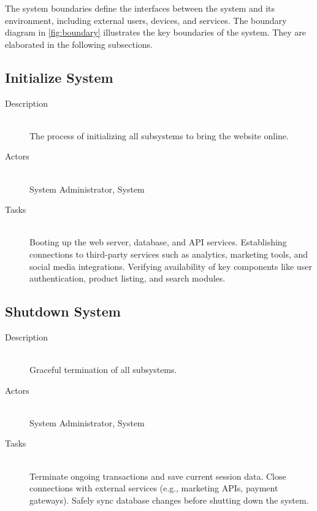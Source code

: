 \documentclass[twoside,a4paper,journal]{IEEEtran}
\begin{document}
The system boundaries define the interfaces between the system and its
environment, including external users, devices, and services.
The boundary diagram in \autoref{fig:boundary} illustrates the key boundaries
of the system.
They are elaborated in the following subsections.

\subsection{Initialize System}
\begin{description}
  \item[Description] \hfill \\
    The process of initializing all subsystems to bring the website online.
  \item[Actors] \hfill \\
    System Administrator, System
  \item[Tasks] \hfill \\
    Booting up the web server, database, and API services.
    Establishing connections to third-party services such as analytics,
    marketing tools, and social media integrations.
    Verifying availability of key components like user authentication, product
    listing, and search modules.
\end{description}

\subsection{Shutdown System}
\begin{description}
  \item[Description] \hfill \\
    Graceful termination of all subsystems.
  \item[Actors] \hfill \\
    System Administrator, System
  \item[Tasks] \hfill \\
    Terminate ongoing transactions and save current session data.
    Close connections with external services (e.g., marketing APIs, payment
    gateways). Safely sync database changes before shutting down the system.
\end{description}
\end{document}
